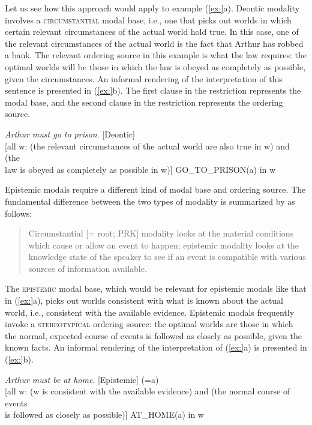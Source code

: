 Let us see how this approach would apply to example (\ref{ex:}a). Deontic modality involves a \textsc{circumstantial} modal base, i.e., one that picks out worlds in which certain relevant circumstances of the actual world hold true. In this case, one of the relevant circumstances of the actual world is the fact that Arthur has robbed a bank. The relevant ordering source in this example is what the law requires: the optimal worlds will be those in which the law is obeyed as completely as possible, given the circumstances. An informal rendering of the interpretation of this sentence is presented in (\ref{ex:}b). The first clause in the restriction represents the modal base, and the second clause in the restriction represents the ordering source.


\ea
\ea \textit{Arthur must go to prison}.  [Deontic]\\
\ex{} [all w: (the relevant circumstances of the actual world are also true in w) and (the \\
  law is obeyed as completely as possible in w)] GO\_TO\_PRISON(a) in w
\z
\z


Epistemic modals require a different kind of modal base and ordering source. The fundamental difference between the two types of modality is summarized by \citet[1494]{Hacquard2011} as follows:


\begin{quote}
Circumstantial [= root; PRK] modality looks at the material conditions which cause or allow an event to happen; epistemic modality looks at the knowledge state of the speaker to see if an event is compatible with various sources of information available.
\end{quote}


The \textsc{epistemic} modal base, which would be relevant for epistemic modals like that in (\ref{ex:}a), picks out worlds consistent with what is known about the actual world, i.e., consistent with the available evidence. Epistemic modals frequently invoke a \textsc{stereotypical} ordering source: the optimal worlds are those in which the normal, expected course of events is followed as closely as possible, given the known facts. An informal rendering of the interpretation of (\ref{ex:}a) is presented in (\ref{ex:}b).


\ea
\ea \textit{Arthur must be at home}.  [Epistemic]  (=a)\\
\ex{} [all w: (w is consistent with the available evidence) and (the normal course of events \\
  is followed as closely as possible)] AT\_HOME(a) in w
\z
\z


